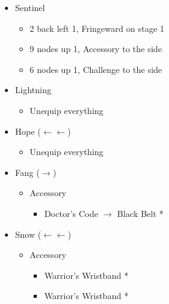 \begin{menu}
\begin{multicols}{2}
\begin{itemize}
\begin{itemize}
\begin{itemize}
\begin{itemize}
                      \end{itemize}
                \item Sentinel
                      \begin{itemize}
                        \item 2 back left 1, Fringeward on stage 1
                        \item 9 nodes up 1, Accessory to the side
                        \item 6 nodes up 1, Challenge to the side
                      \end{itemize}
              \end{itemize}
      \end{itemize}
      \columnbreak
      \equip
      \begin{itemize}
        \item Lightning
              \begin{itemize}
                \item Unequip everything
              \end{itemize}
        \item Hope ($\leftarrow\leftarrow$)
              \begin{itemize}
                \item Unequip everything
              \end{itemize}
        \item Fang ($\rightarrow$)
              \begin{itemize}
                \item Accessory
                      \begin{itemize}
                        \item Doctor's Code $\rightarrow$ Black Belt *
                      \end{itemize}
              \end{itemize}
        \item Snow ($\leftarrow\leftarrow$)
              \begin{itemize}
                \item Accessory
                      \begin{itemize}
                        \item Warrior's Wristband *
                        \item Warrior's Wristband *
                      \end{itemize}
              \end{itemize}

\end{itemize}
\end{itemize}
\end{multicols}
\end{menu}
